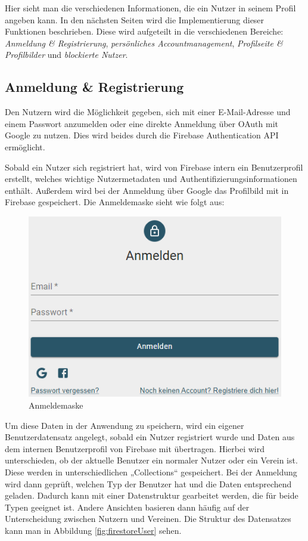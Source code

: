 Hier sieht man die verschiedenen Informationen, die ein Nutzer in seinem Profil angeben kann.
In den nächsten Seiten wird die Implementierung dieser Funktionen beschrieben.
Diese wird aufgeteilt in die verschiedenen Bereiche: \textit{Anmeldung \& Registrierung}, \textit{persönliches Accountmanagement}, \textit{Profilseite \& Profilbilder} und \textit{blockierte Nutzer}.

\subsection{Anmeldung \& Registrierung}
\label{sec:login}

Den Nutzern wird die Möglichkeit gegeben, sich mit einer E-Mail-Adresse und einem Passwort anzumelden oder eine direkte Anmeldung über OAuth mit Google zu nutzen.
Dies wird beides durch die Firebase Authentication API ermöglicht.

Sobald ein Nutzer sich registriert hat, wird von Firebase intern ein Benutzerprofil erstellt, welches wichtige Nutzermetadaten und Authentifizierungsinformationen enthält.
Außerdem wird bei der Anmeldung über Google das Profilbild mit in Firebase gespeichert.
Die Anmeldemaske sieht wie folgt aus:

\begin{figure}[ht!]
  \begin{centering}
    \includegraphics[width=.75\textwidth]{figures/implementation/anmeldemaske.png}
    \caption{Anmeldemaske}
    \label{fig:login}
  \end{centering}
\end{figure}

Um diese Daten in der Anwendung zu speichern, wird ein eigener Benutzerdatensatz angelegt, sobald ein Nutzer registriert wurde und Daten aus dem internen Benutzerprofil von Firebase mit übertragen.
Hierbei wird unterschieden, ob der aktuelle Benutzer ein normaler Nutzer oder ein Verein ist.
Diese werden in unterschiedlichen „Collections“ gespeichert.
Bei der Anmeldung wird dann geprüft, welchen Typ der Benutzer hat und die Daten entsprechend geladen.
Dadurch kann mit einer Datenstruktur gearbeitet werden, die für beide Typen geeignet ist.
Andere Ansichten basieren dann häufig auf der Unterscheidung zwischen Nutzern und Vereinen.
Die Struktur des Datensatzes kann man in Abbildung \ref{fig:firestoreUser} sehen.

